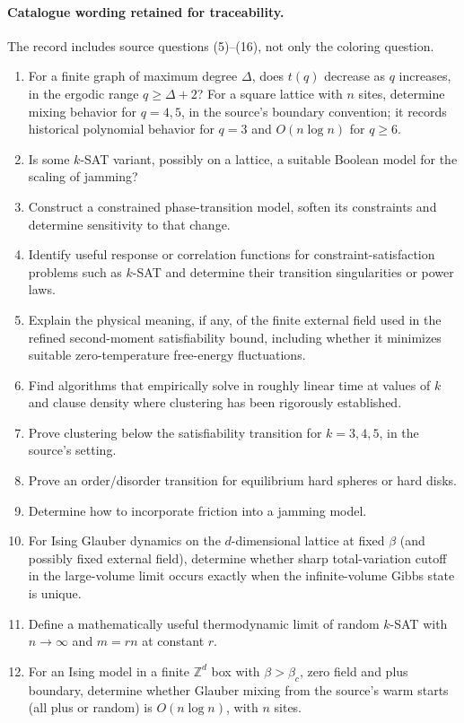 \documentclass[11pt]{article}
\begin{document}
\paragraph{Catalogue wording retained for traceability.}
The record includes source questions (5)--(16), not only the coloring question.
\begin{enumerate}
\item For a finite graph of maximum degree $\Delta$, does $t(q)$ decrease as $q$ increases, in the ergodic range $q\ge\Delta+2$? For a square lattice with $n$ sites, determine mixing behavior for $q=4,5$, in the source’s boundary convention; it records historical polynomial behavior for $q=3$ and $O(n\log n)$ for $q\ge6$.
\item Is some $k$-SAT variant, possibly on a lattice, a suitable Boolean model for the scaling of jamming?
\item Construct a constrained phase-transition model, soften its constraints and determine sensitivity to that change.
\item Identify useful response or correlation functions for constraint-satisfaction problems such as $k$-SAT and determine their transition singularities or power laws.
\item Explain the physical meaning, if any, of the finite external field used in the refined second-moment satisfiability bound, including whether it minimizes suitable zero-temperature free-energy fluctuations.
\item Find algorithms that empirically solve in roughly linear time at values of $k$ and clause density where clustering has been rigorously established.
\item Prove clustering below the satisfiability transition for $k=3,4,5$, in the source’s setting.
\item Prove an order/disorder transition for equilibrium hard spheres or hard disks.
\item Determine how to incorporate friction into a jamming model.
\item For Ising Glauber dynamics on the $d$-dimensional lattice at fixed $\beta$ (and possibly fixed external field), determine whether sharp total-variation cutoff in the large-volume limit occurs exactly when the infinite-volume Gibbs state is unique.
\item Define a mathematically useful thermodynamic limit of random $k$-SAT with $n\to\infty$ and $m=rn$ at constant $r$.
\item For an Ising model in a finite $\mathbb Z^d$ box with $\beta>\beta_c$, zero field and plus boundary, determine whether Glauber mixing from the source’s warm starts (all plus or random) is $O(n\log n)$, with $n$ sites.
\end{enumerate}
\end{document}
